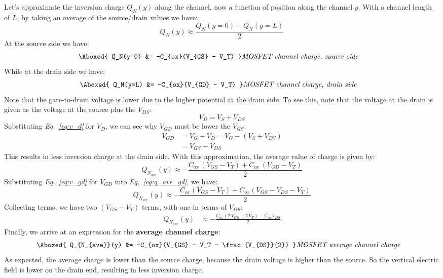 Let's approximate the inversion charge $Q_N(y)$ along the channel, now a function of position along the channel $y$.  With a channel length of $L$, by taking an average of the source/drain values we have:
    \begin{equation} 
        Q_N(y) \approx \frac{Q_N(y = 0) + Q_N(y = L)}{2}
    \end{equation}
At the source side we have:
    \begin{align} 
        \Aboxed{ Q_N(y=0) &= -C_{ox}(V_{GS} - V_T) } &\textit{MOSFET channel charge, source side}
    \end{align}
While at the drain side we have:
    \begin{align} 
        \Aboxed{ Q_N(y=L) &= -C_{ox}(V_{GD} - V_T) } &\textit{MOSFET channel charge, drain side}
    \end{align}
Note that the gate-to-drain voltage is lower due to the higher potential at the drain side.  To see this, note that 
the voltage at the drain is given as the voltage at the source plus the $V_{DS}$:
    \begin{equation}
    	V_D = V_S + V_{DS}
    	\label{eq:v_d}
    \end{equation}
Substituting \emph{Eq.~\ref{eq:v_d}} for $V_D$, we can see why $V_{GD}$ must be lower the $V_{GS}$:
    \begin{align}
    	V_{GD} &= V_{G} - V_{D} = V_{G} - (V_S + V_{DS})\\
    	&= V_{GS} - V_{DS}
    	\label{eq:v_gd}
    \end{align}
This results in less inversion charge at the drain side.  With this approximation, the average value of charge is given by:
    \begin{equation}
        Q_{N_{ave}}(y) \approx - \frac{C_{ox}\,(V_{GS} - V_T) + C_{ox}\,(V_{GD} - V_T)}{2}
        \label{eq:q_ave_gd}
    \end{equation}
Substituting \emph{Eq.~\ref{eq:v_gd}} for $V_{GD}$ into \emph{Eq.~\ref{eq:q_ave_gd}}, we have:
    \begin{equation}
        Q_{N_{ave}}(y) \approx -\frac{C_{ox}(V_{GS} - V_T) + C_{ox}(V_{GS} - V_{DS} - V_T)}{2}
    \end{equation}
Collecting terms, we have two $(V_{GS} - V_T)$ terms, with one in terms of $V_{DS}$:
    \begin{align}
        Q_{N_{ave}}(y) &\approx -\frac{C_{ox}(2\,V_{GS} - 2\,V_T) - C_{ox}V_{DS}}{2}
    \end{align}
Finally, we arrive at an expression for the \textbf{average channel charge}:
    \begin{align}
        \Aboxed{ Q_{N_{ave}}(y) &= -C_{ox}(V_{GS} - V_T - \frac{V_{DS}}{2}) } &\textit{MOSFET average channel charge}
    \end{align}
As expected, the average charge is lower than the source charge, because the drain voltage is higher than the source.  So the vertical electric field is lower on the drain end, resulting in less inversion charge.
